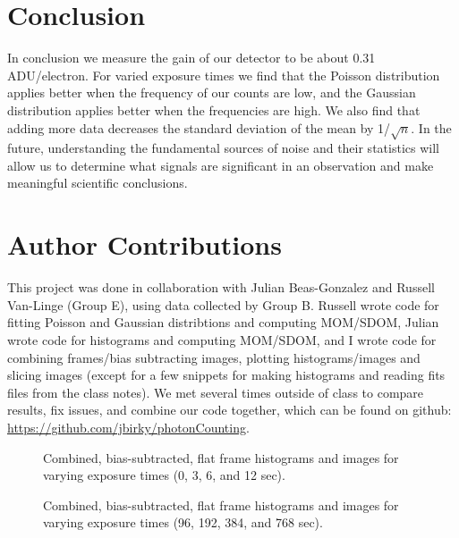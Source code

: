 \documentclass[preprint]{aastex62}
\begin{document}
\section{Conclusion}
In conclusion we measure the gain of our detector to be about 0.31 ADU/electron. For varied exposure times we find that the Poisson distribution applies better when the frequency of our counts are low, and the Gaussian distribution applies better when the frequencies are high. We also find that adding more data decreases the standard deviation of the mean by 1/$\sqrt{n}$. In the future, understanding the fundamental sources of noise and their statistics will allow us to determine what signals are significant in an observation and make meaningful scientific conclusions.

\section{Author Contributions}

This project was done in collaboration with Julian Beas-Gonzalez and Russell Van-Linge (Group E), using data collected by Group B. Russell wrote code for fitting Poisson and Gaussian distribtions and computing MOM/SDOM, Julian wrote code for histograms and computing MOM/SDOM, and I wrote code for combining frames/bias subtracting images, plotting histograms/images and slicing images (except for a few snippets for making histograms and reading fits files from the class notes). We met several times outside of class to compare results, fix issues, and combine our code together, which can be found on github: \href{https://github.com/jbirky/photonCounting}{https://github.com/jbirky/photonCounting}.

\begin{figure}[H]
\caption{Combined, bias-subtracted, flat frame histograms and images for varying exposure times (0, 3, 6, and 12 sec). \label{fig:flats1}}
\end{figure}
\begin{figure}[H]
\caption{Combined, bias-subtracted, flat frame histograms and images for varying exposure times (96, 192, 384, and 768 sec). \label{fig:flats2}}
\end{figure}
\end{document}
